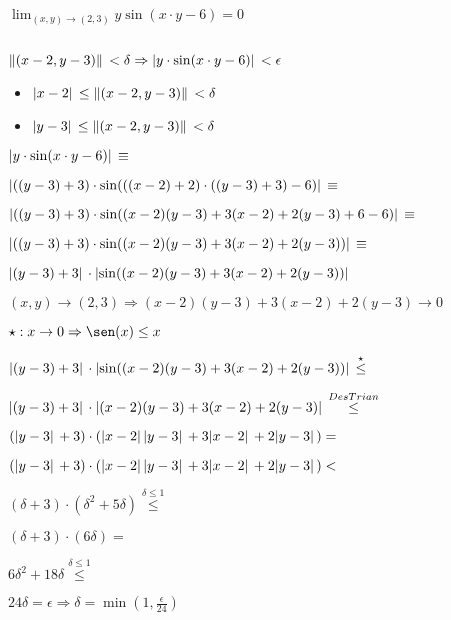 \documentclass[../practica_03.tex]{subfiles}
\begin{document}
    $ \lim_{(x,y)\to(2,3)}  y\sin(x\cdot y -6) = 0 $

    $ $

    $ \norm*{(x-2,y-3)} < \delta \Rightarrow \abs*{y\cdot \sin(x \cdot y - 6)} < \epsilon $

    \begin{itemize}
        \item $\abs*{x-2} \leq \norm*{(x-2,y-3)} < \delta$
        \item $\abs*{y-3} \leq \norm*{(x-2,y-3)} < \delta$
    \end{itemize}

    $\abs*{y\cdot \sin(x \cdot y - 6)} \equiv$

    $\abs*{((y-3)+3)\cdot\sin(((x-2)+2)\cdot((y-3)+3) - 6)} \equiv$

    $\abs*{((y-3)+3)\cdot\sin((x-2)(y-3) + 3(x-2) + 2(y-3) + 6 - 6)} \equiv$

    $\abs*{((y-3)+3)\cdot\sin((x-2)(y-3) + 3(x-2) + 2(y-3))} \equiv$

    $\abs*{(y-3)+3} \cdot \abs*{\sin((x-2)(y-3) + 3(x-2) + 2(y-3))}$ 

    $(x,y) \to (2,3) \Rightarrow (x-2)(y-3) + 3(x-2) + 2(y-3) \to 0 $

    $ \star: x \to 0 \Rightarrow \sen(x) \leq x $

    $\abs*{(y-3)+3} \cdot \abs*{\sin((x-2)(y-3) + 3(x-2) + 2(y-3))} \stackrel{\star}{\leq}$ 

    $\abs*{(y-3)+3} \cdot \abs*{(x-2)(y-3) + 3(x-2) + 2(y-3)} \stackrel{DesTrian}{\leq}$

    $(\abs*{y-3} + 3) \cdot (\abs*{x-2}\abs*{y-3} + 3 \abs*{x-2} + 2\abs*{y-3}) = $ 

    $(\abs*{y-3} + 3) \cdot (\abs*{x-2}\abs*{y-3} + 3 \abs*{x-2} + 2\abs*{y-3}) < $

    $(\delta + 3) \cdot (\delta^2 + 5\delta) \stackrel{\delta \leq 1}{\leq} $ 

    $(\delta + 3) \cdot (6\delta) = $

    $6\delta^2 + 18\delta \stackrel{\delta \leq 1}{\leq} $

    $24\delta = \epsilon \Rightarrow \delta = \min(1,\frac{\epsilon}{24})$ 
\end{document}
